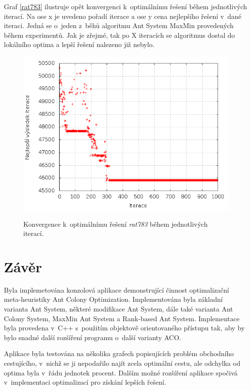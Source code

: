 \documentclass[a4paper, 12pt]{article}
\begin{document}
Graf \ref{rat783} ilustruje opět konvergenci k~optimálnímu řešení během jednotlivých iterací. Na ose x je uvedeno pořadí iterace a ose y cena nejlepšího
řešení v~dané iteraci. Jedná se o~jeden z~běhů algoritmu Ant System MaxMin provedených během experimentů. Jak je zřejmé, tak po X iteracích se algoritmus
dostal do lokálního optima a lepší řešení nalezeno již nebylo.
\begin{figure}[bt]
\begin{center}
\scalebox{0.6}
{
  \includegraphics{imgs/best_lin.png}
}
\caption{
Konvergence k~optimálnímu řešení \emph{rat783} během jednotlivých iterací.}
\label{fig:best_rat}
\end{center}
\end{figure}

\section{Závěr}
\label{sec:concl}
Byla implemetována konzolová aplikace demonstrující činnost optimalizační meta-heuristiky Ant Colony Optimization. 
Implementována byla základní varianta Ant System, některé
modifikace Ant System, dále také varianta Ant Colony System, MaxMin Ant System a Rank-based Ant System.
Implementace byla provedena v~C++ s~použitím objektově orientovaného přístupu tak, aby by bylo snadné další rozšíření programu o~další varianty ACO.

Aplikace byla testována na několika grafech popisujících problém obchodního cestujícího, v~nichž se ji nepodařilo najít zcela optimální cestu, ale odchylka 
od optima byla v~řádu jednotek procent. Dalším možné rozšíření aplikace spočivá v~implementaci optimalizací
pro získání lepších řešení.
\end{document}
